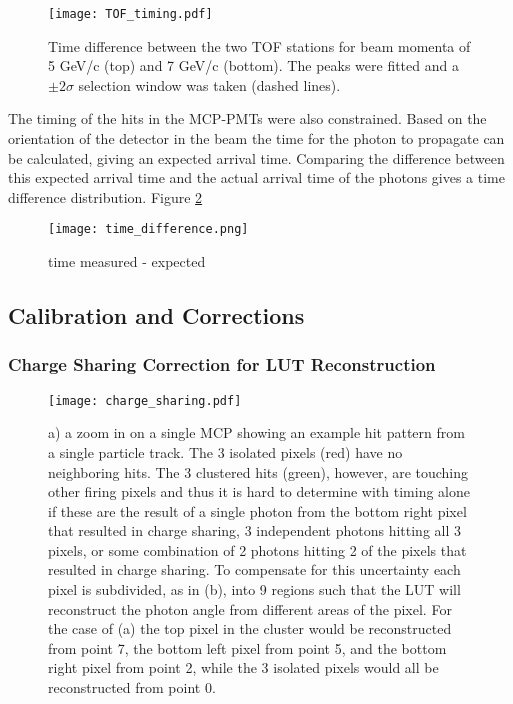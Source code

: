 \begin{figure}[!htb]
	\centering
	\texttt{[image: TOF\_timing.pdf]}
	\caption{Time difference between the two TOF stations for beam momenta of 5 GeV/c (top) and 7 GeV/c (bottom). The peaks were fitted and a $\pm2\sigma$ selection window was taken (dashed lines).}
	\label{fig:tof_timing}
\end{figure}

The timing of the hits in the MCP-PMTs were also constrained. Based on the orientation of the detector in the beam the time for the photon to propagate can be calculated, giving an expected arrival time. Comparing the difference between this expected arrival time and the actual arrival time of the photons gives a time difference distribution. Figure \ref{fig:time_difference}

\begin{figure}[!htb]
	\centering
	\texttt{[image: time\_difference.png]}
	\caption{time measured - expected}
	\label{fig:time_difference}
\end{figure}

\subsection{Calibration and Corrections}

\subsubsection{Charge Sharing Correction for LUT Reconstruction}
\begin{figure}[!htb]
	\centering
	\texttt{[image: charge\_sharing.pdf]}
	\caption{a) a zoom in on a single MCP showing an example hit pattern from a single particle track. The 3 isolated pixels (red) have no neighboring hits. The 3 clustered hits (green), however, are touching other firing pixels and thus it is hard to determine with timing alone if these are the result of a single photon from the bottom right pixel that resulted in charge sharing, 3 independent photons hitting all 3 pixels, or some combination of 2 photons hitting 2 of the pixels that resulted in charge sharing. To compensate for this uncertainty each pixel is subdivided, as in (b), into 9 regions such that the LUT will reconstruct the photon angle from different areas of the pixel. For the case of (a) the top pixel in the cluster would be reconstructed from point 7, the bottom left pixel from point 5, and the bottom right pixel from point 2, while the 3 isolated pixels would all be reconstructed from point 0.}
	\label{fig:charge_sharing}
\end{figure}


